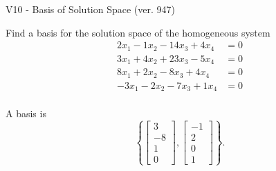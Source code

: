 \begin{exercise}
  \begin{exerciseTitle}V10 - Basis of Solution Space (ver. 947)\end{exerciseTitle}
  \begin{exerciseStatement}
    Find a basis for the solution space of the homogeneous system 
\begin{align*}
 2 x_ 1 -1 x_ 2 -14 x_ 3 + 4 x_ 4 &= 0  \\ 
  3 x_ 1 + 4 x_ 2 + 23 x_ 3 -5 x_ 4 &= 0  \\ 
  8 x_ 1 + 2 x_ 2 -8 x_ 3 + 4 x_ 4 &= 0  \\ 
  -3 x_ 1 -2 x_ 2 -7 x_ 3 + 1 x_ 4 &= 0  \\ 
 \end{align*}


 
  \end{exerciseStatement}

  \begin{exerciseAnswer}
   A basis is   
\[\left\{\left[\begin{array}{c}
3 \\
-8 \\
1 \\
0
\end{array}\right] , \left[\begin{array}{c}
-1 \\
2 \\
0 \\
1
\end{array}\right]\right\}.\]

  


  \end{exerciseAnswer}
\end{exercise}